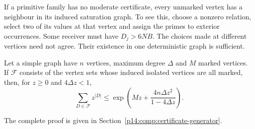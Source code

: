 If a primitive family has no moderate certificate, every unmarked
vertex has a neighbour in its induced saturation graph. To see this,
choose a nonzero relation, select two of its values at that vertex and
assign the primes to exterior occurrences. Some receiver must have
$D_j>6NB$. The choices made at different vertices need not agree.
Their existence in one deterministic graph is sufficient.

\begin{lemma}
\label{p1:core:generator}
Let a simple graph have $n$ vertices, maximum degree $\Delta$ and
$M$ marked vertices. If $\mathcal F$ consists of the vertex sets
whose induced isolated vertices are all marked, then, for $z\ge0$
and $4\Delta z<1$,
\begin{equation}
 \sum_{D\in\mathcal F}z^{|D|}
 \le\exp\left(Mz+\frac{4n\Delta z^2}{1-4\Delta z}\right).
 \label{p1:core:generator-bound}
\end{equation}
\end{lemma}
\noindent The complete proof is given in Section~\ref{p14:comp:certificate-generator}.

